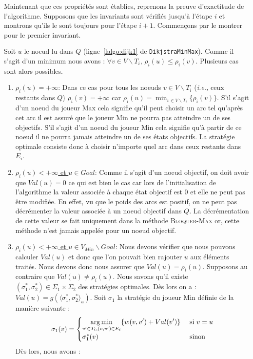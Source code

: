 Maintenant que ces propriétés sont établies, reprenons la preuve d'exactitude de l'algorithme. Supposons que les invariants sont vérifiés jusqu'à l'étape $i$ et montrons qu'ils le sont toujours pour l'étape $i+1$.
Commençons par le montrer pour le premier invariant.

Soit $u$ le noeud lu dans $Q$ (ligne~\ref{lalgo:dijk1} de \verb|DikjstraMinMax|). Comme il s'agit d'un minimum nous avons : $\forall v \in V\backslash T_i,\, \rho_i(u) \leq \rho_i(v)$. Plusieurs cas sont alors possibles. 

\begin{enumerate}
	\item \underline{$\rho_i(u) = +\infty$}: Dans ce cas pour tous les noeuds $v \in V\backslash  T_i $ (\emph{i.e.,} ceux restants dans $Q$) $\rho_i(v) = + \infty$ car $\rho_i(u) = \min _{v \in V\backslash T_i } \{\rho_i(v)\}$. S'il s'agit d'un noeud du joueur Max cela signifie qu'il peut choisir un arc tel qu'après cet arc il est assuré que le joueur Min ne pourra pas atteindre un de ses objectifs. S'il s'agit d'un noeud du joueur Min cela signifie qu'à partir de ce noeud il ne pourra jamais atteindre un de ses états objectifs. La stratégie optimale consiste donc à choisir n'importe quel arc dans ceux restants dans $E_i$.
	\item\underline{$\rho_i(u) < +\infty$ et $u \in Goal$}: Comme il s'agit d'un noeud objectif, on doit avoir que $Val(u) = 0$ ce qui est bien le cas car lors de l'initialisation de l'algorithme la valeur associée à chaque état objectif est 0 et elle ne peut pas être modifiée. En effet, vu que le poids des arcs est positif, on ne peut pas décrémenter la valeur associée à un noeud objectif dans $Q$. La décrémentation de cette valeur se fait uniquement dans la méthode \textsc{Bloquer-Max} or, cette méthode n'est jamais appelée pour un noeud objectif.
	
	\item\underline{$\rho_i(u) < +\infty$ et $u \in V_{Min}\backslash Goal$}: Nous devons vérifier que nous pouvons calculer $Val(u)$ et donc que l'on pouvait bien rajouter $u$ aux éléments traités. Nous devons donc nous assurer que $Val(u) = \rho_i(u)$.
	Supposons au contraire que $Val(u) \neq \rho_i(u)$. Nous savons qu'il existe $(\sigma_1^*,\sigma_2^*) \in \Sigma_1 \times \Sigma_2 $ des stratégies optimales. Dès lors on a : $Val(u) = g(\langle \sigma_1^*, \sigma_2^* \rangle_u)$. Soit $\sigma_1$ la stratégie du joueur Min définie de la manière suivante : $$  \sigma_1(v) = \begin{cases}
											\displaystyle	\operatorname*{arg\,min}_{v'\in T_i,(v,v')\in E_i} \{ w(v,v') + Val(v') \} & \text{ si } v = u\\
												\sigma_1^*(v) &\text{ sinon} \end{cases}$$
Dès lors, nous avons : 


\end{enumerate}
